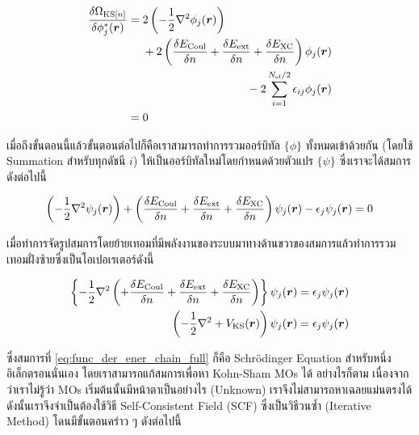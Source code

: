 \begin{align}
    \fdv{\Omega_{\text{KS}[n]}}{\phi^{\ast}_{j}(\bm{r})}
     & = \begin{multlined}[t]
             2 \left ( -\frac{1}{2}\nabla^{2} \phi_{j}(\bm{r}) \right ) \\
             + 2 \left ( \fdv{E_{\text{Coul}}}{n} + \fdv{E_{\text{ext}}}{n} + \fdv{E_{\text{XC}}}{n} \right )
             \phi_{j}(\bm{r}) \\
             - 2 \sum^{N_{\text{el}}/2}_{i=1} \epsilon_{ij} \phi_{j}(\bm{r})
         \end{multlined} \\
     & = 0
\end{align}

เมื่อถึงขั้นตอนนี้แล้วขั้นตอนต่อไปก็คือเราสามารถทำการรวมออร์บิทัล $\{\phi\}$ ทั้งหมดเข้าด้วยกัน (โดยใช้ Summation สำหรับทุกดัชนี $i$)
ให้เป็นออร์บิทัลใหม่โดยกำหนดด้วยตัวแปร $\{\psi\}$ ซึ่งเราจะได้สมการดังต่อไปนี้

\begin{equation}
    \left ( -\frac{1}{2}\nabla^{2} \psi_{j}(\bm{r}) \right )
    + \left ( \fdv{E_{\text{Coul}}}{n} + \fdv{E_{\text{ext}}}{n} + \fdv{E_{\text{XC}}}{n} \right )
    \psi_{j}(\bm{r}) - \epsilon_{j} \psi_{j}(\bm{r})
    = 0
\end{equation}

\noindent เมื่อทำการจัดรูปสมการโดยย้ายเทอมที่มีพลังงานของระบบมาทางด้านขวาของสมการแล้วทำการรวมเทอมฝั่งซ้ายซึ่งเป็นโอเปอเรเตอร์ดังนี้

\begin{align}
    \left \{ -\frac{1}{2}\nabla^{2} \left (
    + \fdv{E_{\text{Coul}}}{n} + \fdv{E_{\text{ext}}}{n} + \fdv{E_{\text{XC}}}{n} \right )
    \right \} \psi_{j}(\bm{r})
    = \epsilon_{j} \psi_{j}(\bm{r}) \nonumber \\
    \left ( -\frac{1}{2}\nabla^{2} + V_{\text{KS}}(\bm{r}) \right ) \psi_{j}(\bm{r})
    = \epsilon_{j} \psi_{j}(\bm{r}) \label{eq:func_der_ener_chain_full}
\end{align}

\noindent ซึ่งสมการที่ \eqref{eq:func_der_ener_chain_full} ก็คือ Schr\"{o}dinger Equation สำหรับหนึ่งอิเล็กตรอนนั่นเอง
โดยเราสามารถแก้สมการเพื่อหา Kohn-Sham MOs ได้ อย่างไรก็ตาม เนื่องจากว่าเราไม่รู้ว่า MOs เริ่มต้นนั้นมีหน้าตาเป็นอย่างไร (Unknown)
เราจึงไม่สามารถหาเฉลยแม่นตรงได้ ดังนั้นเราจึงจำเป็นต้องใช้วิธี Self-Consistent Field (SCF) ซึ่งเป็นวิธีวนซ้ำ (Iterative Method)
โดนมีขั้นตอนคร่าว ๆ ดังต่อไปนี้

